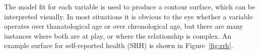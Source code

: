 \documentclass{article}
\begin{document}
The model fit for each variable is used to produce a contour surface, which can
be interpreted visually. In most situations it is obvious to the eye whether a
variable operates over thanatological age or over chronological age, but there
are many instances where both are at play, or where the relationship is
complex. An example surface for self-reported health (SRH) is shown in
Figure~\ref{fig:srh}.
\end{document}
